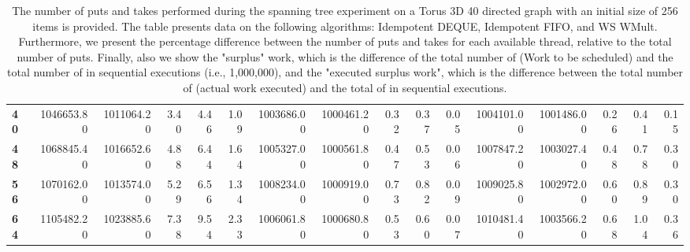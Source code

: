 \begin{table}[!ht]
{\begin{tabular}{lrrrrrrrrrrrrrrr}
\textbf{40} &       1046653.80 & 1011064.20 &           3.40 &        4.46 &                 1.09 &      1003686.00 & 1000461.20 &           0.32 &        0.37 &                 0.05 & 1004101.00 & 1001486.00 &           0.26 &        0.41 &                 0.15 \\
\textbf{48} &       1068845.40 & 1016652.60 &           4.88 &        6.44 &                 1.64 &      1005327.00 & 1000561.80 &           0.47 &        0.53 &                 0.06 & 1007847.20 & 1003027.40 &           0.48 &        0.78 &                 0.30 \\
\textbf{56} &       1070162.00 & 1013574.00 &           5.29 &        6.56 &                 1.34 &      1008234.00 & 1000919.00 &           0.73 &        0.82 &                 0.09 & 1009025.80 & 1002972.00 &           0.60 &        0.89 &                 0.30 \\
\textbf{64} &       1105482.20 & 1023885.60 &           7.38 &        9.54 &                 2.33 &      1006061.80 & 1000680.80 &           0.53 &        0.60 &                 0.07 & 1010481.40 & 1003566.20 &           0.68 &        1.04 &                 0.36 \\
\bottomrule
\end{tabular}}
\label{difference-Torus_3D_40_directed-256-IDEMPOTENT_DEQUE-IDEMPOTENT_FIFO-WS_NC_MULT_OPT}
\caption{The number of puts and takes performed during the
    spanning tree experiment on a Torus 3D 40 directed graph with an initial size
    of 256 items is provided. The table presents data on the
    following algorithms: Idempotent DEQUE, Idempotent FIFO, and
    WS WMult. Furthermore, we present the percentage difference
    between the number of puts and takes for each available thread,
    relative to the total number of puts. Finally, also we show the
    "surplus" work, which is the difference of the total number of
    \Puts (Work to be scheduled) and the total number of \Puts in
    sequential executions (i.e., 1,000,000), and the "executed surplus
    work", which is the difference between the total number of \Takes
    (actual work executed) and the total of \Takes in sequential
    executions.}
\end{table}
